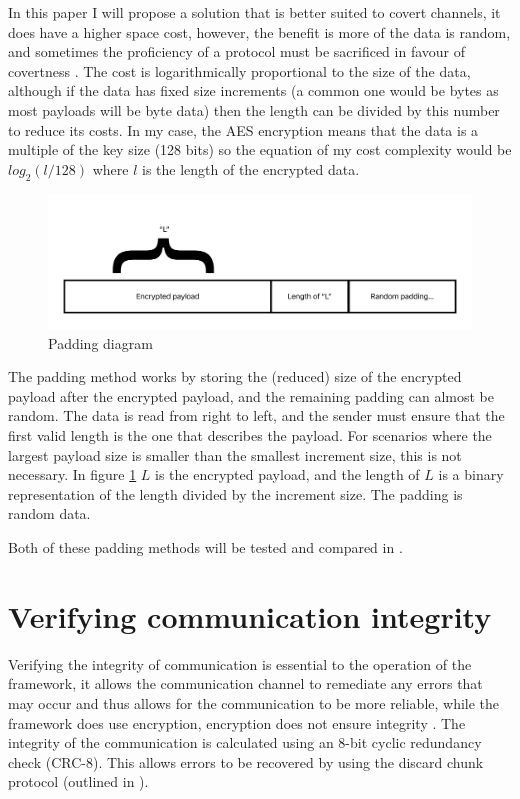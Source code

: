 In this paper I will propose a solution that is better suited to covert channels, it does have a higher space cost, however, the benefit is more of the data is random, and sometimes the proficiency of a protocol must be sacrificed in favour of covertness \citep{oCDCCEDNA}. The cost is logarithmically proportional to the size of the data, although if the data has fixed size increments (a common one would be bytes as most payloads will be byte data) then the length can be divided by this number to reduce its costs. In my case, the AES encryption means that the data is a multiple of the key size (128 bits) so the equation of my cost complexity would be $log_2(l/128)$ where $l$ is the length of the encrypted data.

\begin{figure}
    \centering
    \includegraphics{fig/Padding_diagram.pdf}
    \caption{Padding diagram}
    \label{fig:padding_diagram}
\end{figure}

The padding method works by storing the (reduced) size of the encrypted payload after the encrypted payload, and the remaining padding can almost be random. The data is read from right to left, and the sender must ensure that the first valid length is the one that describes the payload. For scenarios where the largest payload size is smaller than the smallest increment size, this is not necessary. In figure \ref{fig:padding_diagram} $L$ is the encrypted payload, and the length of $L$ is a binary representation of the length divided by the increment size. The padding is random data.

Both of these padding methods will be tested and compared in .

\section{Verifying communication integrity}
\label{sec:integrity}

Verifying the integrity of communication is essential to the operation of the framework, it allows the communication channel to remediate any errors that may occur and thus allows for the communication to be more reliable, while the framework does use encryption, encryption does not ensure integrity \citep{GUCCA}. The integrity of the communication is calculated using an 8-bit cyclic redundancy check (CRC-8). This allows errors to be recovered by using the discard chunk protocol (outlined in ).

